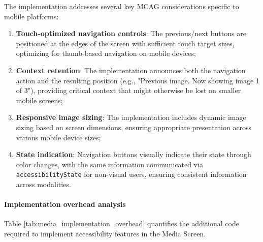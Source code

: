 The implementation addresses several key MCAG considerations specific to mobile platforms:
\begin{enumerate}
    \item \textbf{Touch-optimized navigation controls}: The previous/next buttons are positioned at the edges of the screen with sufficient touch target sizes, optimizing for thumb-based navigation on mobile devices;
    
    \item \textbf{Context retention}: The implementation announces both the navigation action and the resulting position (e.g., "Previous image. Now showing image 1 of 3"), providing critical context that might otherwise be lost on smaller mobile screens;
    
    \item \textbf{Responsive image sizing}: The implementation includes dynamic image sizing based on screen dimensions, ensuring appropriate presentation across various mobile device sizes;
    
    \item \textbf{State indication}: Navigation buttons visually indicate their state through color changes, with the same information communicated via \texttt{accessibilityState} for non-visual users, ensuring consistent information across modalities.
\end{enumerate}

\paragraph{Implementation overhead analysis}

Table \ref{tab:media_implementation_overhead} quantifies the additional code required to implement accessibility features in the Media Screen.

